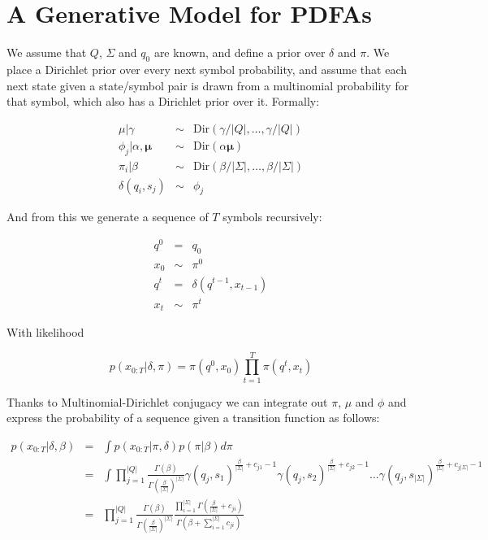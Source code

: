 \section{A Generative Model for PDFAs}

We assume that $Q$, $\Sigma$ and $q_0$ are known, and define a prior over $\delta$ and $\pi$.  We place a Dirichlet prior over every next symbol probability, and assume that each next state given a state/symbol pair is drawn from a multinomial probability for that symbol, which also has a Dirichlet prior over it.  Formally:

\begin{eqnarray}
\mu|\gamma & \sim & \mathrm{Dir}\left(\gamma/|Q|,\ldots,\gamma/|Q|\right) \\
\phi_{j}|\alpha,\mathbf{\mu}  & \sim & \mathrm{Dir}(\alpha\mathbf{\mu}) \\
\pi_{i}|\beta & \sim & \mathrm{Dir}(\beta/|\Sigma|,\ldots,\beta/|\Sigma|)\\
\delta(q_i,s_j) & \sim & \phi_{j}
\end{eqnarray}

And from this we generate a sequence of $T$ symbols recursively:

\begin{eqnarray*}
q^0 & = & q_0 \\
x_0 & \sim & \pi^0 \\
q^t & = & \delta(q^{t-1},x_{t-1}) \\
x_t & \sim & \pi^t
\end{eqnarray*}

With likelihood

\[ p(x_{0:T}|\delta,\pi) = \pi(q^0,x_0)\prod_{t=1}^T \pi(q^t,x_t) \]

Thanks to Multinomial-Dirichlet conjugacy we can integrate out $\pi$, $\mu$ and $\phi$ and express the probability of a sequence given a transition function as follows:

\begin{eqnarray}
 p(x_{0:T}|\delta,\beta) & = & \int p(x_{0:T}|\pi,\delta) p(\pi|\beta) d\pi \\
 & = &  \int \prod_{j=1}^{|Q|} \frac{\Gamma(\beta)}{\Gamma(\frac{\beta}{|\Sigma|})^{|\Sigma|}} \gamma(q_j,s_1)^{\frac{\beta}{|\Sigma|}+c_{j1}-1} \gamma(q_j,s_2)^{\frac{\beta}{|\Sigma|}+c_{j2}-1} \ldots \gamma(q_j,s_{|\Sigma|})^{\frac{\beta}{|\Sigma|}+c_{j|\Sigma|}-1} \\
 & = & \prod_{j=1}^{|Q|} \frac{\Gamma(\beta)}{\Gamma(\frac{\beta}{|\Sigma|})^{|\Sigma|}} \frac{\prod_{i=1}^{|\Sigma|}\Gamma(\frac{\beta}{|\Sigma|} + c_{ji})}{\Gamma(\beta + \sum_{i=1}^{|\Sigma|} c_{ji})}
 \end{eqnarray}
 
